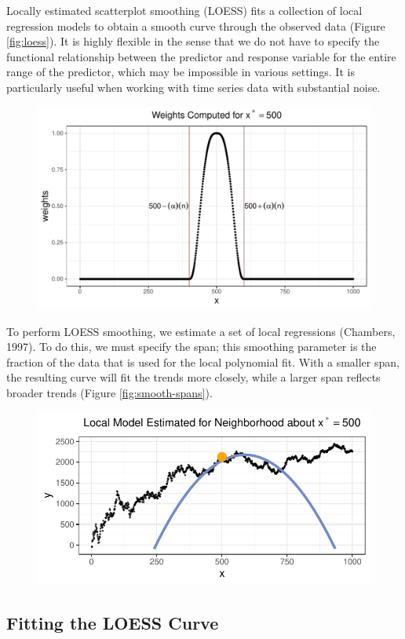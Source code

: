 \documentclass[12pt,twoside]{smiththesis}
\begin{document}
Locally estimated scatterplot smoothing (LOESS) fits a collection of local regression models to obtain a smooth curve through the observed data (Figure \ref{fig:loess}). It is highly flexible in the sense that we do not have to specify the functional relationship between the predictor and response variable for the entire range of the predictor, which may be impossible in various settings. It is particularly useful when working with time series data with substantial noise.
\begin{figure}

{\centering \includegraphics{thesis_files/figure-latex/unnamed-chunk-26-1} 

}

\caption{\label{fig:loess}}\label{fig:unnamed-chunk-26}
\end{figure}
To perform LOESS smoothing, we estimate a set of local regressions (Chambers, 1997). To do this, we must specify the span; this smoothing parameter is the fraction of the data that is used for the local polynomial fit. With a smaller span, the resulting curve will fit the trends more closely, while a larger span reflects broader trends (Figure \ref{fig:smooth-spans}).
\begin{figure}

{\centering \includegraphics{thesis_files/figure-latex/unnamed-chunk-27-1} 

}

\caption{\label{fig:smooth-spans}}\label{fig:unnamed-chunk-27}
\end{figure}
\hypertarget{fitting-the-loess-curve}{%
\subsection{Fitting the LOESS Curve}\label{fitting-the-loess-curve}}
\end{document}
